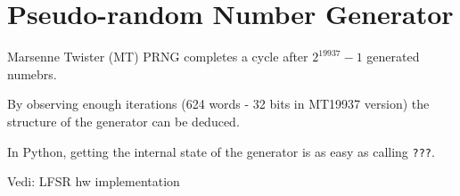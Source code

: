 \chapter{Pseudo-random Number Generator}
Marsenne Twister (MT) PRNG completes a cycle after $2^19937-1$ generated numebrs.

By observing enough iterations (624 words - 32 bits in MT19937 version) the structure of the generator can be deduced.

In Python, getting the internal state of the generator is as easy as calling \texttt{???}.

Vedi: LFSR hw implementation